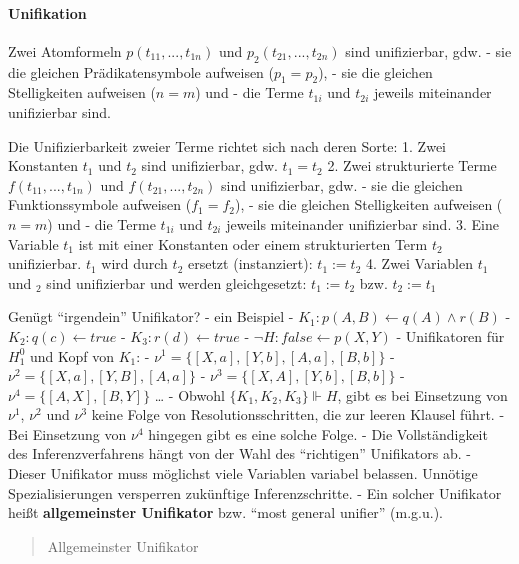 \documentclass[a4paper]{article}
\begin{document}
\begin{multicols}{3}
  \paragraph{Unifikation}\label{unifikation}

  Zwei Atomformeln $p(t_{11},...,t_{1n})$ und $p_2(t_{21},...,t_{2n})$
  sind unifizierbar, gdw. - sie die gleichen Prädikatensymbole aufweisen
  ($p_1= p_2$), - sie die gleichen Stelligkeiten aufweisen ($n = m$) und -
  die Terme $t_{1i}$ und $t_{2i}$ jeweils miteinander unifizierbar sind.

  Die Unifizierbarkeit zweier Terme richtet sich nach deren Sorte: 1. Zwei
  Konstanten $t_1$ und $t_2$ sind unifizierbar, gdw. $t_1= t_2$ 2. Zwei
  strukturierte Terme $f(t_{11},...,t_{1n})$ und $f(t_{21},...,t_{2n})$
  sind unifizierbar, gdw. - sie die gleichen Funktionssymbole aufweisen
  ($f_1= f_2$), - sie die gleichen Stelligkeiten aufweisen ($n=m$) und -
  die Terme $t_{1i}$ und $t_{2i}$ jeweils miteinander unifizierbar sind.
  3. Eine Variable $t_1$ ist mit einer Konstanten oder einem
  strukturierten Term $t_2$ unifizierbar. $t_1$ wird durch $t_2$ ersetzt
  (instanziert): $t_1:= t_2$ 4. Zwei Variablen $t_1$ und $_2$ sind
  unifizierbar und werden gleichgesetzt: $t_1:=t_2$ bzw. $t_2:= t_1$

  Genügt ``irgendein'' Unifikator? - ein Beispiel -
  $K_1: p(A,B)\leftarrow q(A)\wedge r(B)$ - $K_2:q(c)\leftarrow true$ -
  $K_3:r(d)\leftarrow true$ - $\lnot H: false\leftarrow p(X,Y)$ -
  Unifikatoren für $H_1^0$ und Kopf von $K_1$: -
  $\nu^1 = \{[X,a],[Y,b],[A,a],[B,b]\}$ - $\nu^2 =\{[X,a],[Y,B],[A,a]\}$ -
  $\nu^3 =\{[X,A],[Y,b],[B,b]\}$ - $\nu^4=\{[A,X],[B,Y]\}$ \ldots{} -
  Obwohl $\{K_1, K_2, K_3\}\Vdash H$, gibt es bei Einsetzung von $\nu^1$,
  $\nu^2$ und $\nu^3$ keine Folge von Resolutionsschritten, die zur leeren
  Klausel führt. - Bei Einsetzung von $\nu^4$ hingegen gibt es eine solche
  Folge. - Die Vollständigkeit des Inferenzverfahrens hängt von der Wahl
  des ``richtigen'' Unifikators ab. - Dieser Unifikator muss möglichst
  viele Variablen variabel belassen. Unnötige Spezialisierungen versperren
  zukünftige Inferenzschritte. - Ein solcher Unifikator heißt
  \textbf{allgemeinster Unifikator} bzw. ``most general unifier''
  (m.g.u.).

  \begin{quote}
    Allgemeinster Unifikator


\end{quote}
\end{multicols}
\end{document}
